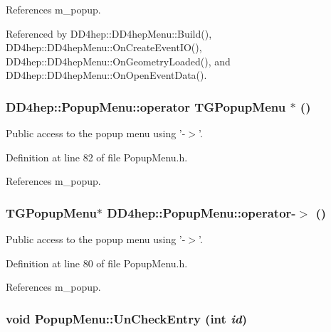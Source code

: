 References m\_\-popup.

Referenced by DD4hep::DD4hepMenu::Build(), DD4hep::DD4hepMenu::OnCreateEventIO(), DD4hep::DD4hepMenu::OnGeometryLoaded(), and DD4hep::DD4hepMenu::OnOpenEventData().\hypertarget{class_d_d4hep_1_1_popup_menu_a979ec84020ea83105d4bfc6c5c5b8fe8}{
\subsubsection[{operator TGPopupMenu $\ast$}]{\setlength{\rightskip}{0pt plus 5cm}DD4hep::PopupMenu::operator TGPopupMenu $\ast$ ()}}
\label{class_d_d4hep_1_1_popup_menu_a979ec84020ea83105d4bfc6c5c5b8fe8}


Public access to the popup menu using '-\/$>$'. 

Definition at line 82 of file PopupMenu.h.

References m\_\-popup.\hypertarget{class_d_d4hep_1_1_popup_menu_a0241a71021c9288a1f6207a25d6a82e6}{
\subsubsection[{operator-\/$>$}]{\setlength{\rightskip}{0pt plus 5cm}TGPopupMenu$\ast$ DD4hep::PopupMenu::operator-\/$>$ ()}}
\label{class_d_d4hep_1_1_popup_menu_a0241a71021c9288a1f6207a25d6a82e6}


Public access to the popup menu using '-\/$>$'. 

Definition at line 80 of file PopupMenu.h.

References m\_\-popup.\hypertarget{class_d_d4hep_1_1_popup_menu_aca647cd86c210af4bf0f4e48f487a341}{
\subsubsection[{UnCheckEntry}]{\setlength{\rightskip}{0pt plus 5cm}void PopupMenu::UnCheckEntry (int {\em id})}}
\label{class_d_d4hep_1_1_popup_menu_aca647cd86c210af4bf0f4e48f487a341}


